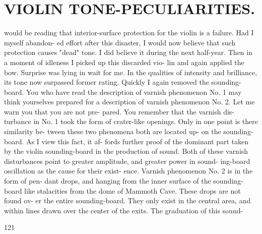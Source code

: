 \documentclass{article}
\begin{document}
\section*{VIOLIN TONE-PECULIARITIES.}
would be reading that interior-surface protection for the violin is a failure. Had I myself abandon- ed effort after this disaster, I would now believe that such protection causes "dead" tone. I did believe it during the next half-year. Then in a moment of idleness I picked up this discarded vio- lin and again applied the bow. Surprise was lying in wait for me. In the qualities of intensity and brilliance, its tone now surpassed former rating. Quickly I again removed the sounding-board. You who have read the description of varnish phenomenon No. 1 may think yourselves prepared for a description of varnish phenomenon No. 2. Let me warn you that you are not pre- pared. You remember that the varnish dis- turbance in No. 1 took the form of crater-like openings. Only in one point is there similarity be- tween these two phenomena both are located up- on the sounding-board. As I view this fact, it af- fords further proof of the dominant part taken by the violin sounding-board in the production of sound. Both of these varnish disturbances point to greater amplitude, and greater power in sound- ing-board oscillation as the cause for their exist- ence. Varnish phenomenon No. 2 is in the form of pen- dant drops, and hanging from the inner surface of the sounding-board like stalacities from the dome of Mammoth Cave. These drops are not found ov- er the entire sounding-board. They only exist in the central area, and within lines drawn over the center of the exits. The graduation of this sound-

121
\end{document}
